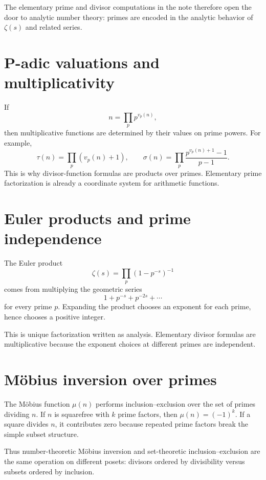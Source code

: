 The elementary prime and divisor computations in the note therefore open the door to analytic number theory: primes are encoded in the analytic behavior of $\zeta(s)$ and related series.

\section{P-adic valuations and multiplicativity}

If
\[
  n=\prod_p p^{v_p(n)},
\]
then multiplicative functions are determined by their values on prime powers.  For example,
\[
  \tau(n)=\prod_p (v_p(n)+1),\qquad
  \sigma(n)=\prod_p \frac{p^{v_p(n)+1}-1}{p-1}.
\]
This is why divisor-function formulas are products over primes.  Elementary prime factorization is already a coordinate system for arithmetic functions.

\section{Euler products and prime independence}

The Euler product
\[
  \zeta(s)=\prod_p(1-p^{-s})^{-1}
\]
comes from multiplying the geometric series
\[
  1+p^{-s}+p^{-2s}+\cdots
\]
for every prime $p$.  Expanding the product chooses an exponent for each prime, hence chooses a positive integer.

This is unique factorization written as analysis.  Elementary divisor formulas are multiplicative because the exponent choices at different primes are independent.

\section{Möbius inversion over primes}

The Möbius function $\mu(n)$ performs inclusion--exclusion over the set of primes dividing $n$.  If $n$ is squarefree with $k$ prime factors, then $\mu(n)=(-1)^k$.  If a square divides $n$, it contributes zero because repeated prime factors break the simple subset structure.

Thus number-theoretic Möbius inversion and set-theoretic inclusion--exclusion are the same operation on different posets: divisors ordered by divisibility versus subsets ordered by inclusion.

